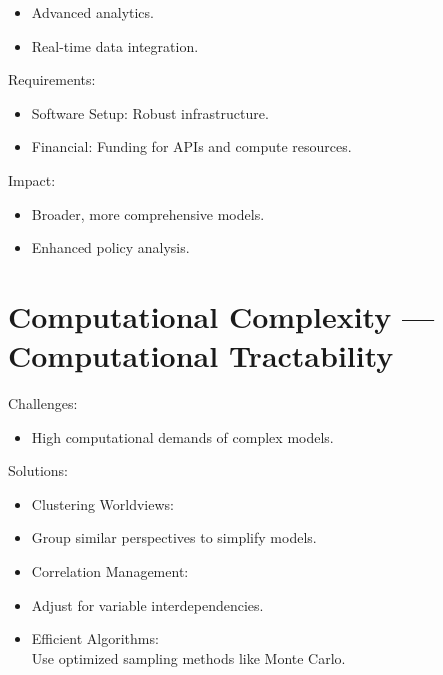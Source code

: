 \documentclass[
  letterpaper,
]{book}
\providecommand{\tightlist}{%
  \setlength{\itemsep}{0pt}\setlength{\parskip}{0pt}}
\begin{document}
\begin{itemize}
\tightlist
\item
  Advanced analytics.\\
\item
  Real-time data integration.
\end{itemize}

Requirements:

\begin{itemize}
\tightlist
\item
  Software Setup: Robust infrastructure.\\
\item
  Financial: Funding for APIs and compute resources.
\end{itemize}

Impact:

\begin{itemize}
\tightlist
\item
  Broader, more comprehensive models.\\
\item
  Enhanced policy analysis.
\end{itemize}

\section{Computational Complexity --- Computational
Tractability}\label{computational-complexity-computational-tractability}

Challenges:

\begin{itemize}
\tightlist
\item
  High computational demands of complex models.
\end{itemize}

Solutions:

\begin{itemize}
\tightlist
\item
  Clustering Worldviews:\\
\item
  Group similar perspectives to simplify models.\\
\item
  Correlation Management:\\
\item
  Adjust for variable interdependencies.\\
\item
  Efficient Algorithms:\\
  Use optimized sampling methods like Monte Carlo.
\end{itemize}
\end{document}
